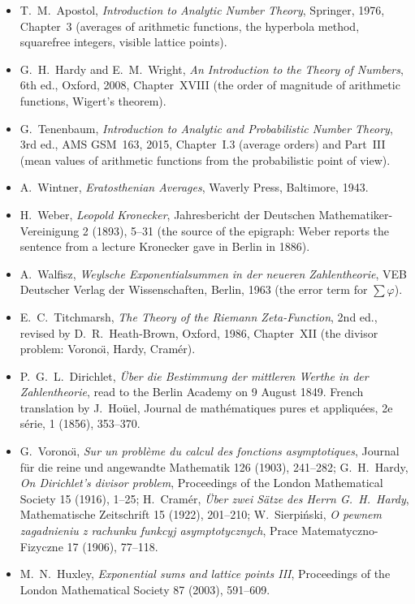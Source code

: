 \begin{itemize}
\item T.~M.~Apostol, \emph{Introduction to Analytic Number Theory}, Springer, 1976, Chapter~3 (averages of arithmetic functions, the
hyperbola method, squarefree integers, visible lattice points).
\item G.~H.~Hardy and E.~M.~Wright, \emph{An Introduction to the Theory of Numbers}, 6th ed., Oxford, 2008, Chapter~XVIII (the order of
magnitude of arithmetic functions, Wigert's theorem).
\item G.~Tenenbaum, \emph{Introduction to Analytic and Probabilistic Number Theory}, 3rd ed., AMS GSM~163, 2015, Chapter~I.3 (average orders) and
Part~III (mean values of arithmetic functions from the probabilistic point of view).
\item A.~Wintner, \emph{Eratosthenian Averages}, Waverly Press, Baltimore, 1943.
\item H.~Weber, \emph{Leopold Kronecker}, Jahresbericht der Deutschen Mathematiker-Vereinigung 2 (1893), 5--31 (the source of the epigraph: Weber
reports the sentence from a lecture Kronecker gave in Berlin in 1886).
\item A.~Walfisz, \emph{Weylsche Exponentialsummen in der neueren Zahlentheorie}, VEB Deutscher Verlag der Wissenschaften, Berlin, 1963 (the error term
for $\sum\varphi$).
\item E.~C.~Titchmarsh, \emph{The Theory of the Riemann Zeta-Function}, 2nd ed., revised by D.~R.~Heath-Brown, Oxford, 1986, Chapter~XII
(the divisor problem: Vorono\"\i, Hardy, Cram\'er).
\item P.~G.~L.~Dirichlet, \emph{\"Uber die Bestimmung der mittleren Werthe in der Zahlentheorie}, read to the Berlin Academy on 9 August 1849. French translation by J.~Ho\"uel, Journal de math\'ematiques pures et appliqu\'ees, 2e s\'erie, 1 (1856), 353--370.
\item G.~Vorono\"\i, \emph{Sur un probl\`eme du calcul des fonctions asymptotiques}, Journal f\"ur die reine und angewandte Mathematik 126 (1903),
241--282; G.~H.~Hardy, \emph{On Dirichlet's divisor problem}, Proceedings of the London Mathematical Society 15 (1916), 1--25; H.~Cram\'er, \emph{\"Uber
zwei S\"atze des Herrn G.~H.~Hardy}, Mathematische Zeitschrift 15 (1922), 201--210; W.~Sierpi\'nski, \emph{O pewnem zagadnieniu z rachunku funkcyj
asymptotycznych}, Prace Matematyczno-Fizyczne 17 (1906), 77--118.
\item M.~N.~Huxley, \emph{Exponential sums and lattice points III}, Proceedings of the London Mathematical Society 87 (2003), 591--609.

\end{itemize}
